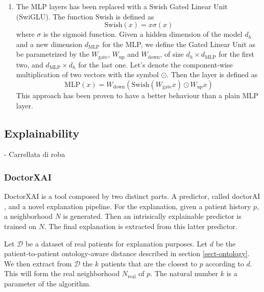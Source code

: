 \documentclass[]{marticle}
\newcommand{\ds}{\mathcal{D}}
\begin{document}
\begin{enumerate}
\item The MLP layers has been replaced with a Swish Gated Linear Unit (SwiGLU). The function Swish
is defined as
$$ \text{Swish}(x) = x \sigma(x) $$
where $\sigma$ is the sigmoid function. Given a hidden dimension of the model $d_h$ and a new
dimension $d_\text{MLP}$ for the MLP, we define the Gated Linear Unit as be parametrized by the
$W_\text{gate}$, $W_\text{up}$ and $W_\text{down}$, of size $d_h\times d_\text{MLP}$ for the first
two, and $d_\text{MLP} \times d_h$ for the last one. Let's denote the component-wise multiplication
of two vectors with the symbol $\odot$. Then the layer is defined as $$ \text{MLP}(x) =
W_\text{down} (\text{Swish}(W_\text{gate} x) \odot W_\text{up} x) $$ This approach has been proven
to have a better behaviour than a plain MLP layer.
\end{enumerate}

\subsection{Explainability }

- Carrellata di roba

\subsubsection{DoctorXAI}


DoctorXAI \cite{panigutti-xai} is a tool composed by two distinct parts. A predictor, called
doctorAI \cite{paper-doctor-ai}, and a novel explanation pipeline.  For the explanation, given a patient history $p$, a neighborhood $N$ is generated. Then an
intrisically explainable predictor is trained on $N$. The final explanation is extracted from this
latter predictor.

\newcommand{\realds}{N_\text{real}}

Let $\ds$ be a dataset of real patients for explanation purposes. Let $d$ be the patient-to-patient
ontology-aware distance described in section \ref{sect-ontology}. We then extract from $\ds$ the $k$
patients that are the closest to $p$ according to $d$. This will form the real neighborhood
$\realds$ of $p$. The natural number $k$ is a parameter of the algorithm.
\end{document}
